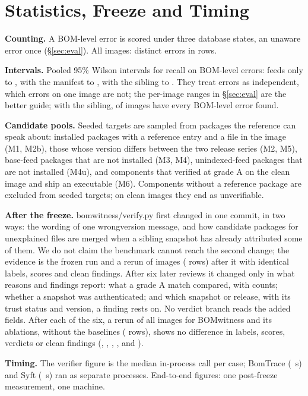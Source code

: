 \documentclass[sigconf,nonacm]{acmart}
\newcommand{\tool}{BOMwitness}
\newcommand{\ubreak}{\textunderscore\allowbreak}
\newcommand{\vd}[1]{{\ttfamily\let\_\ubreak #1}}
\begin{document}
\section{Statistics, Freeze and Timing}
\label{app:stats}

\textbf{Counting.} A BOM-level error is scored under three database states, an unaware error once (\S\ref{sec:eval}). All images: \nAllDistinctErr{} distinct errors in \nAllCases{} rows.

\textbf{Intervals.} Pooled 95\% Wilson intervals for recall on BOM-level errors: feeds only \loColFo{} to \hiColFo, with the manifest \loColNs{} to \hiColNs, with the sibling \loColBw{} to \hiColBw. They treat errors as independent, which errors on one image are not; the per-image ranges in \S\ref{sec:eval} are the better guide; with the sibling, \imgPerfectColBw{} of \nHeldImages{} images have every BOM-level error found.

\textbf{Candidate pools.} Seeded targets are sampled from packages the reference can speak about: installed packages with a reference entry and a file in the image (M1, M2b), those whose version differs between the two release series (M2, M5), base-feed packages that are not installed (M3, M4), unindexed-feed packages that are not installed (M4u), and components that verified at grade A on the clean image and ship an executable (M6). Components without a reference package are excluded from seeded targets; on clean images they end as unverifiable.

\textbf{After the freeze.} \vd{bomwitness/verify.py} first changed in one commit, in two ways: the wording of one \vd{wrong\_version} message, and how candidate packages for unexplained files are merged when a sibling snapshot has already attributed some of them. We do not claim the benchmark cannot reach the second change; the evidence is the frozen run and a rerun of \postImages{} images (\postCases{} rows) after it with identical labels, scores and clean findings. After six later reviews it changed only in what reasons and findings report: what a grade A match compared, with counts; whether a snapshot was authenticated; and which snapshot or release, with its trust status and version, a finding rests on. No verdict branch reads the added fields. After each of the six, a rerun of all \verdictCheckImages{} images for \tool{} and its ablations, without the baselines (\verdictCheckCases{} rows), shows no difference in labels, scores, verdicts or clean findings (\verdictCheckDiffs, \verdictRecheckDiffs, \verdictThirdDiffs, \verdictFourthDiffs, \verdictFifthDiffs{} and \verdictLastDiffs).

\textbf{Timing.} The verifier figure is the median in-process call per case; BomTrace (\secBomtrace~s) and Syft (\secSyft~s) ran as separate processes. End-to-end figures: one post-freeze measurement, one machine.
\end{document}
